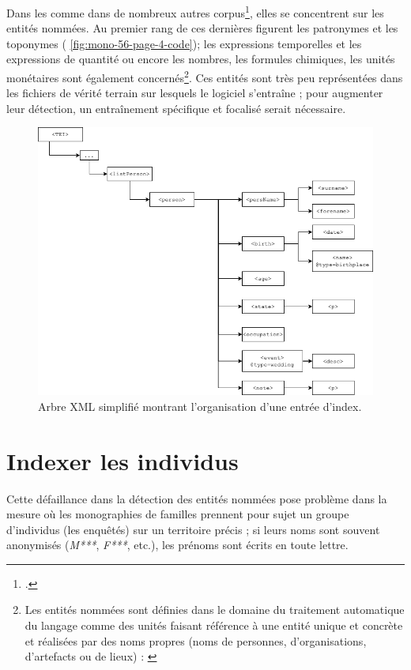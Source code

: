 Dans les \odm{} comme dans de nombreux autres corpus\footcite[p. 1]{sagot}, elles se concentrent sur les entités nommées. Au premier rang de ces dernières figurent les patronymes et les toponymes (\fig{} \ref{fig:mono-56-page-4-code}); les \og expressions temporelles et les expressions de quantité \fg{} ou encore \og les nombres, les formules chimiques, les unités monétaires \fg{} sont également concernés\footnote{Les entités nommées sont définies dans le domaine du traitement automatique du langage comme des \og unités faisant référence à une entité unique et concrète et réalisées par des noms propres (noms de personnes, d’organisations, d’artefacts ou de lieux) \fg{} : \cite[p. 4]{sagot}}. Ces entités sont très peu représentées dans les fichiers de vérité terrain sur lesquels le logiciel s'entraîne ; pour augmenter leur détection, un entraînement spécifique et focalisé serait nécessaire.

\begin{figure}[h]
    \centering
    \includegraphics[width=16cm]{img/index_tree.png}
    \caption{Arbre XML simplifié montrant l'organisation d'une entrée d'index.}
    \label{fig:index_tree}
\end{figure}

\section{Indexer les individus}


Cette défaillance dans la détection des entités nommées pose problème dans la mesure où les monographies de familles prennent pour sujet un groupe d'individus (les enquêtés) sur un territoire précis ; si leurs noms sont souvent anonymisés (\textit{M***}, \textit{F***}, etc.), les prénoms sont écrits en toute lettre.

